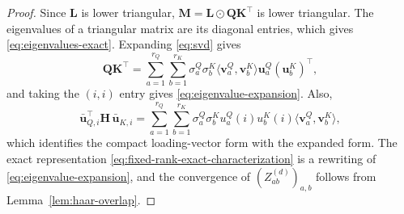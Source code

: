 \documentclass{article}
\newcommand{\hadamard}{\mathbin{\odot}}
\newcommand{\bM}{\mathbf{M}}
\newcommand{\bL}{\mathbf{L}}
\newcommand{\bQ}{\mathbf{Q}}
\newcommand{\bK}{\mathbf{K}}
\newcommand{\bu}{\mathbf{u}}
\newcommand{\bv}{\mathbf{v}}
\newcommand{\bH}{\mathbf{H}}
\theoremstyle{definition}
\theoremstyle{remark}
\begin{document}
\begin{proof}
Since $\bL$ is lower triangular, $\bM=\bL\hadamard\bQ\bK^\top$ is lower
triangular.  The eigenvalues of a triangular matrix are its diagonal entries,
which gives \eqref{eq:eigenvalues-exact}.  Expanding \eqref{eq:svd} gives
\[
    \bQ\bK^\top
    =
    \sum_{a=1}^{r_Q}\sum_{b=1}^{r_K}
    \sigma^Q_a\sigma^K_b
    \langle\bv^Q_a,\bv^K_b\rangle
    \bu^Q_a(\bu^K_b)^\top,
\]
and taking the $(i,i)$ entry gives \eqref{eq:eigenvalue-expansion}.  Also,
\[
    \bar{\bu}_{Q,i}^{\top}\bH\,\bar{\bu}_{K,i}
    =
    \sum_{a=1}^{r_Q}\sum_{b=1}^{r_K}
    \sigma^Q_a\sigma^K_bu^Q_a(i)u^K_b(i)
    \langle\bv^Q_a,\bv^K_b\rangle,
\]
which identifies the compact loading-vector form with the expanded form.  The
exact representation
\eqref{eq:fixed-rank-exact-characterization} is a rewriting of
\eqref{eq:eigenvalue-expansion}, and the convergence of
$(Z_{ab}^{(d)})_{a,b}$ follows from Lemma~\ref{lem:haar-overlap}.
\end{proof}
\end{document}
